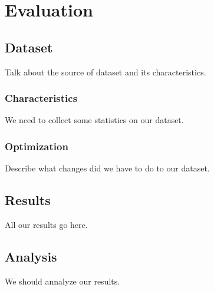 \section{Evaluation}
\label{sec:eval}

\subsection{Dataset}
\label{sec:dataset}

Talk about the source of dataset and its characteristics.

\subsubsection{Characteristics}

We need to collect some statistics on our dataset.

\subsubsection{Optimization}

Describe what changes did we have to do to our dataset.


\subsection{Results}

All our results go here.

\subsection{Analysis}

We should annalyze our results.